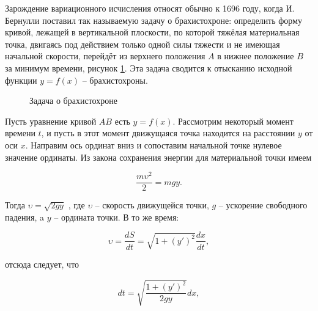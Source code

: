 \documentclass{article}
\begin{document}
Зарождение вариационного исчисления относят обычно к 1696 году, когда И. Бернулли поставил так называемую задачу о брахистохроне: определить форму кривой, лежащей в вертикальной плоскости, по которой тяжёлая материальная точка, двигаясь под действием только одной силы тяжести и не имеющая начальной скорости, перейдёт из верхнего положения $A$ в нижнее положение $B$ за минимум времени, рисунок \ref{img_brachistochrone}. Эта задача сводится к отысканию исходной функции $y = f(x)$ -- брахистохроны.

\begin{figure}[h!]
\caption{Задача о брахистохроне}
\label{img_brachistochrone}
\end{figure}

Пусть уравнение кривой $AB$ есть $y = f(x)$. Рассмотрим некоторый момент времени $t$, и пусть в этот момент движущаяся точка находится на расстоянии $y$ от оси $x$. Направим ось ординат вниз и сопоставим начальной точке нулевое значение ординаты. Из закона сохранения энергии для материальной точки имеем

\begin{displaymath}
    \frac{m\upsilon^2}{2} = mgy.
\end{displaymath}

Тогда $\upsilon = \sqrt{2gy}$ , где $\upsilon$ -- скорость движущейся точки, $g$ -- ускорение свободного падения, a $y$ -- ордината точки. В то же время:

\begin{displaymath}
    \upsilon = \frac{dS}{dt} = \sqrt{1 + (y')^2} \frac{dx}{dt},
\end{displaymath}

\noindent отсюда следует, что

\begin{displaymath}
    dt = \sqrt{\frac{1 + (y')^2}{2gy}}dx,
\end{displaymath}
\end{document}
